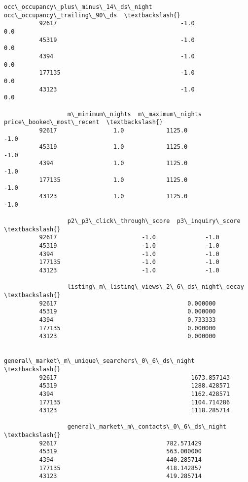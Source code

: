 \documentclass[11pt]{article}
\begin{document}
\begin{Verbatim}[commandchars=\\\{\}]
                  occ\_occupancy\_plus\_minus\_14\_ds\_night  occ\_occupancy\_trailing\_90\_ds  \textbackslash{}
          92617                                   -1.0                           0.0   
          45319                                   -1.0                           0.0   
          4394                                    -1.0                           0.0   
          177135                                  -1.0                           0.0   
          43123                                   -1.0                           0.0   
          
                  m\_minimum\_nights  m\_maximum\_nights  price\_booked\_most\_recent  \textbackslash{}
          92617                1.0            1125.0                      -1.0   
          45319                1.0            1125.0                      -1.0   
          4394                 1.0            1125.0                      -1.0   
          177135               1.0            1125.0                      -1.0   
          43123                1.0            1125.0                      -1.0   
          
                  p2\_p3\_click\_through\_score  p3\_inquiry\_score  \textbackslash{}
          92617                        -1.0              -1.0   
          45319                        -1.0              -1.0   
          4394                         -1.0              -1.0   
          177135                       -1.0              -1.0   
          43123                        -1.0              -1.0   
          
                  listing\_m\_listing\_views\_2\_6\_ds\_night\_decay  \textbackslash{}
          92617                                     0.000000   
          45319                                     0.000000   
          4394                                      0.733333   
          177135                                    0.000000   
          43123                                     0.000000   
          
                  general\_market\_m\_unique\_searchers\_0\_6\_ds\_night  \textbackslash{}
          92617                                      1673.857143   
          45319                                      1288.428571   
          4394                                       1162.428571   
          177135                                     1104.714286   
          43123                                      1118.285714   
          
                  general\_market\_m\_contacts\_0\_6\_ds\_night  \textbackslash{}
          92617                               782.571429   
          45319                               563.000000   
          4394                                440.285714   
          177135                              418.142857   
          43123                               419.285714   
          

\end{Verbatim}
\end{document}
